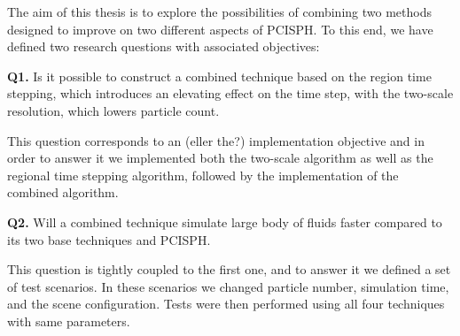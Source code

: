\documentclass[../../main.tex]{subfiles}
\begin{document}

The aim of this thesis is to explore the possibilities of combining two methods designed to improve on two different aspects of PCISPH. To this end, we have defined two research questions with associated objectives: 

\begin{displayquote}
{\large \textbf{Q1.}} 
Is it possible to construct a combined technique based on the region time stepping, which introduces an elevating effect on the time step, with the two-scale resolution, which lowers particle count.
\end{displayquote} 

This question corresponds to an (eller the?) implementation objective and in order to answer it we implemented both the two-scale algorithm as well as the regional time stepping algorithm, followed by the implementation of the combined algorithm. 

\begin{displayquote}
{\large \textbf{Q2.}} Will a combined technique simulate large body of fluids faster compared to its two base techniques and PCISPH.
\end{displayquote}

This question is tightly coupled to the first one, and to answer it we defined a set of test scenarios. In these scenarios we changed particle number, simulation time, and the scene configuration. Tests were then performed using all four techniques with same parameters. 
\end{document}
